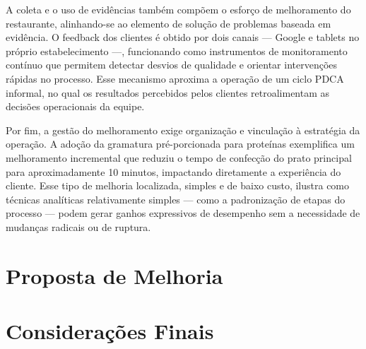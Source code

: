 \documentclass[12pt, a4paper]{article}
\begin{document}
A coleta e o uso de evidências também compõem o esforço de melhoramento do restaurante, alinhando-se ao elemento de solução de problemas baseada em evidência. O feedback dos clientes é obtido por dois canais — Google e tablets no próprio estabelecimento —, funcionando como instrumentos de monitoramento contínuo que permitem detectar desvios de qualidade e orientar intervenções rápidas no processo. Esse mecanismo aproxima a operação de um ciclo PDCA informal, no qual os resultados percebidos pelos clientes retroalimentam as decisões operacionais da equipe.

Por fim, a gestão do melhoramento exige organização e vinculação à estratégia da operação. A adoção da gramatura pré-porcionada para proteínas exemplifica um melhoramento incremental que reduziu o tempo de confecção do prato principal para aproximadamente 10 minutos, impactando diretamente a experiência do cliente. Esse tipo de melhoria localizada, simples e de baixo custo, ilustra como técnicas analíticas relativamente simples — como a padronização de etapas do processo — podem gerar ganhos expressivos de desempenho sem a necessidade de mudanças radicais ou de ruptura.



\section{Proposta de Melhoria}

%
%



\section{Considerações Finais}

%
%



\newpage
\end{document}
